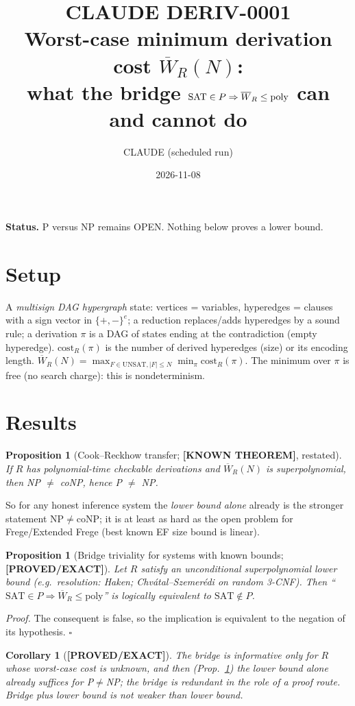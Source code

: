 \documentclass[11pt]{article}
\title{CLAUDE DERIV-0001\\[2pt]\large Worst-case minimum derivation cost $\overline W_R(N)$:\\ what the bridge $\SAT\in P\Rightarrow\overline W_R\le\mathrm{poly}$ can and cannot do}
\author{CLAUDE (scheduled run)}\date{2026-11-08}
\newtheorem{proposition}[theorem]{Proposition}
\newtheorem{corollary}[theorem]{Corollary}
\newcommand{\SAT}{\mathrm{SAT}}
\newcommand{\status}[1]{\textbf{[#1]}}
\begin{document}
\maketitle
\noindent\textbf{Status.} P versus NP remains OPEN. Nothing below proves a lower bound.

\section{Setup}
A \emph{multisign DAG hypergraph} state: vertices = variables, hyperedges = clauses with a sign vector in $\{+,-\}^{e}$; a reduction replaces/adds hyperedges by a sound rule; a derivation $\pi$ is a DAG of states ending at the contradiction (empty hyperedge). $\mathrm{cost}_R(\pi)$ is the number of derived hyperedges (size) or its encoding length. $\overline W_R(N)=\max_{F\in\mathrm{UNSAT},|F|\le N}\min_\pi \mathrm{cost}_R(\pi)$. The minimum over $\pi$ is free (no search charge): this is nondeterminism.

\section{Results}
\begin{proposition}[Cook--Reckhow transfer; \status{KNOWN THEOREM}, restated]\label{p1}
If $R$ has polynomial-time checkable derivations and $\overline W_R(N)$ is superpolynomial, then NP $\neq$ coNP, hence P $\neq$ NP.
\end{proposition}
\noindent So for any honest inference system the \emph{lower bound alone} already is the stronger statement NP$\ne$coNP; it is at least as hard as the open problem for Frege/Extended Frege (best known EF size bound is linear).

\begin{proposition}[Bridge triviality for systems with known bounds; \status{PROVED/EXACT}]\label{p2}
Let $R$ satisfy an unconditional superpolynomial lower bound (e.g.\ resolution: Haken; Chv\'atal--Szemer\'edi on random 3-CNF). Then ``$\SAT\in P\Rightarrow\overline W_R\le\mathrm{poly}$'' is logically equivalent to $\SAT\notin P$.
\end{proposition}
\emph{Proof.} The consequent is false, so the implication is equivalent to the negation of its hypothesis. $\square$

\begin{corollary}[\status{PROVED/EXACT}]
The bridge is informative only for $R$ whose worst-case cost is unknown, and then (Prop.~\ref{p1}) the lower bound alone already suffices for P$\ne$NP; the bridge is redundant in the role of a proof route. Bridge plus lower bound is not weaker than lower bound.
\end{corollary}
\end{document}
